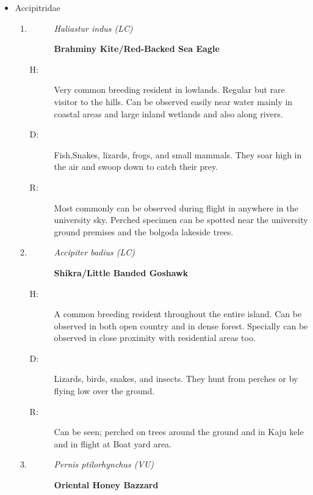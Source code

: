 \begin{itemize}%
\item%
 Accipitridae%
\begin{enumerate}%
\item%
\begin{description}%
\item[]%
\textit{Haliastur indus (LC)}%
\item[]%
\textbf{Brahminy Kite/Red{-}Backed Sea Eagle}%
\end{description}%
\begin{description}%
\item[H: ]%
Very common breeding resident in lowlands. Regular but rare visitor to the hills. Can be observed easily near water mainly in coastal areas and large inland wetlands and also along rivers.%
\item[D: ]%
Fish,Snakes, lizards, frogs, and small mammals. They soar high in the air and swoop down to catch their prey.%
\item[R: ]%
Most commonly can  be observed during flight in anywhere in the university sky. Perched specimen can be spotted near the university ground premises and the bolgoda lakeside trees.%
\end{description}%
\item%
\begin{description}%
\item[]%
\textit{Accipiter badius (LC)}%
\item[]%
\textbf{Shikra/Little Banded Goshawk}%
\end{description}%
\begin{description}%
\item[H: ]%
A common breeding resident throughout the entire island. Can be observed in both open country and in dense forest. Specially can be observed in close proximity with residential areas too.%
\item[D: ]%
 Lizards, birds, snakes, and insects. They hunt from perches or by flying low over the ground.%
\item[R: ]%
Can be seen; perched on trees around the ground and in Kaju kele and in flight at Boat yard area.%
\end{description}%
\item%
\begin{description}%
\item[]%
\textit{Pernis ptilorhynchus (VU)}%
\item[]%
\textbf{Oriental Honey Bazzard}%
\end{description}%

\end{enumerate}
\end{itemize}
